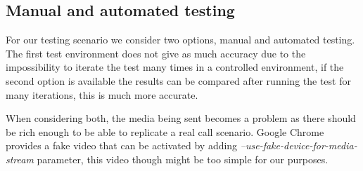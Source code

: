 \subsection{Manual and automated testing}

For our testing scenario we consider two options, manual and automated testing. The first test environment does not give as much accuracy due to the impossibility to iterate the test many times in a controlled environment, if the second option is available the results can be compared after running the test for many iterations, this is much more accurate.

When considering both, the media being sent becomes a problem as there should be rich enough to be able to replicate a real call scenario. Google Chrome provides a fake video that can be activated by adding {\it --use-fake-device-for-media-stream} parameter, this video though might be too simple for our purposes.


